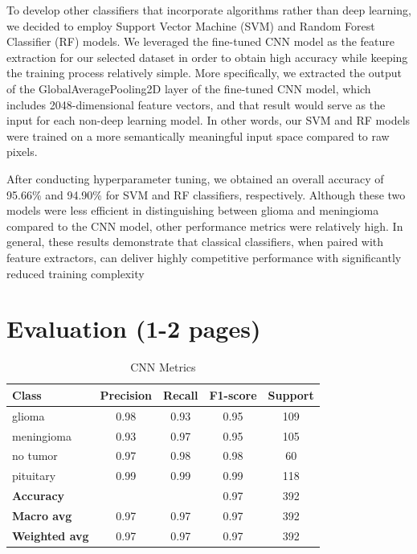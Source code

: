 \documentclass[conference]{IEEEtran}
\begin{document}
To develop other classifiers that incorporate algorithms rather than deep learning, we decided to employ Support Vector Machine (SVM) and Random Forest Classifier (RF) models. We leveraged the fine-tuned CNN model as the feature extraction for our selected dataset in order to obtain high accuracy while keeping the training process relatively simple. More specifically, we extracted the output of the GlobalAveragePooling2D layer of the fine-tuned CNN model, which includes 2048-dimensional feature vectors, and that result would serve as the input for each non-deep learning model. In other words, our SVM and RF models were trained on a more semantically meaningful input space compared to raw pixels. 

After conducting hyperparameter tuning, we obtained an overall accuracy of 95.66\% and 94.90\% for SVM and RF classifiers, respectively. Although these two models were less efficient in distinguishing between glioma and meningioma compared to the CNN model, other performance metrics were relatively high. In general, these results demonstrate that classical classifiers, when paired with feature extractors, can deliver highly competitive performance with significantly reduced training complexity

\section{\large Evaluation (1-2 pages)}

\begin{table}[h!]
\centering
\caption{CNN Metrics}
\begin{tabular}{lcccc}
\toprule
\textbf{Class} & \textbf{Precision} & \textbf{Recall} & \textbf{F1-score} & \textbf{Support} \\
\midrule
glioma     & 0.98 & 0.93 & 0.95 & 109 \\
meningioma & 0.93 & 0.97 & 0.95 & 105 \\
no tumor   & 0.97 & 0.98 & 0.98 & 60  \\
pituitary  & 0.99 & 0.99 & 0.99 & 118 \\
\midrule
\textbf{Accuracy}    &      &      & 0.97 & 392 \\
\textbf{Macro avg}   & 0.97 & 0.97 & 0.97 & 392 \\
\textbf{Weighted avg}& 0.97 & 0.97 & 0.97 & 392 \\
\bottomrule
\end{tabular}
\end{table}
\end{document}
